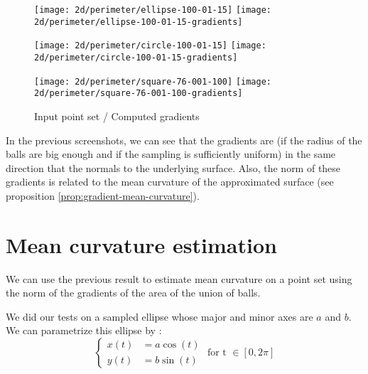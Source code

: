 \begin{figure}[H]
    \centering

    \begin{minipage}{0.8\linewidth}
        \centering
        \texttt{[image: 2d/perimeter/ellipse-100-01-15]}
        \texttt{[image: 2d/perimeter/ellipse-100-01-15-gradients]}
        \label{fig:gradients_perimeter_2d_ellipse}
    \end{minipage}

    \begin{minipage}{0.8\linewidth}
        \centering
        \texttt{[image: 2d/perimeter/circle-100-01-15]}
        \texttt{[image: 2d/perimeter/circle-100-01-15-gradients]}
        \label{fig:gradients_perimeter_2d_circle}
    \end{minipage}

    \begin{minipage}{0.8\linewidth}
        \centering
        \texttt{[image: 2d/perimeter/square-76-001-100]}
        \texttt{[image: 2d/perimeter/square-76-001-100-gradients]}
        \label{fig:gradients_perimeter_2d_square}
    \end{minipage}

    \caption{Input point set / Computed gradients}
    \label{fig:gradients_perimeter_2d}
\end{figure}

In the previous screenshots, we can see that the gradients are (if the radius of
the balls are big enough and if the sampling is sufficiently uniform) in the
same direction that the normals to the underlying surface. Also, the norm of
these gradients is related to the mean curvature of the approximated surface
(see proposition \ref{prop:gradient-mean-curvature}).

\section{Mean curvature estimation}

We can use the previous result to estimate mean curvature on a point set using
the norm of the gradients of the area of the union of balls.

We did our tests on a sampled ellipse whose major and minor axes are $ a $ and $ b $. We
can parametrize this ellipse by :
$$
\begin{cases}
    x(t) &= a \cos (t) \\
    y(t) &= b \sin (t)
\end{cases}
\text{ for t } \in [ 0, 2\pi ]
$$

